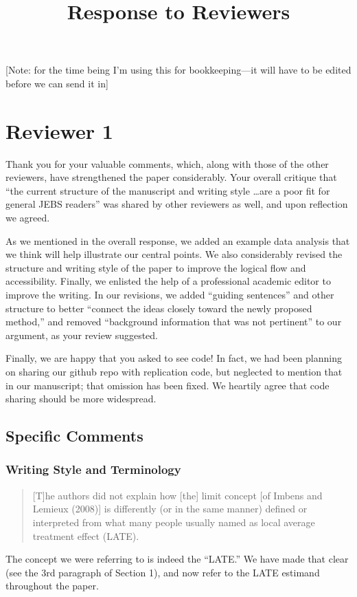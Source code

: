 \documentclass[12pt]{article}
\title{Response to Reviewers}
\begin{document}
\maketitle

[Note: for the time being I'm using this for bookkeeping---it will
have to be edited before we can send it in]\\

\section{Reviewer 1}
Thank you for your valuable comments, which, along with those of the
other reviewers, have strengthened the paper considerably. Your
overall critique that ``the current structure of the manuscript
and writing style \dots are a poor fit for general JEBS readers'' was
shared by other reviewers as well, and upon reflection we agreed.

As we mentioned in the overall response, we added an example data
analysis that we think will help illustrate our central points. We
also considerably revised the structure and writing style of the paper
to improve the logical flow and accessibility. Finally, we enlisted
the help of a professional academic editor to improve the writing. In
our revisions, we added ``guiding sentences'' and other structure to
better ``connect the ideas closely toward the newly proposed method,''
and removed ``background information that was not pertinent'' to our
argument, as your review suggested.

Finally, we are happy that you asked to see code! In fact, we had been
planning on sharing our github repo with replication code, but
neglected to mention that in our manuscript; that omission has been
fixed. We heartily agree that code sharing should be more widespread.

\subsection{Specific Comments}
\subsubsection{Writing Style and Terminology}
\begin{quote}
[T]he authors did not explain how [the] limit concept [of Imbens and
Lemieux (2008)] is differently (or in the same manner) defined or
interpreted from what many people usually named as local average
treatment effect (LATE).
\end{quote}
The concept we were referring to is indeed the ``LATE.'' We have made
that clear (see the 3rd paragraph of Section 1), and now refer to the
LATE estimand throughout the paper.
\end{document}
